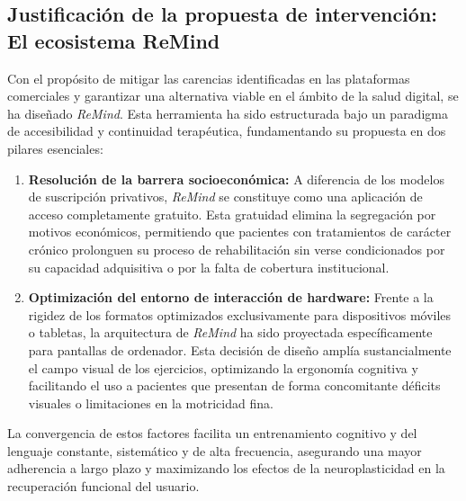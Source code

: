 \subsection{Justificación de la propuesta de intervención: El ecosistema ReMind}
Con el propósito de mitigar las carencias identificadas en las plataformas comerciales y garantizar una alternativa viable en el ámbito de la salud digital, se ha diseñado \textit{ReMind}. Esta herramienta ha sido estructurada bajo un paradigma de accesibilidad y continuidad terapéutica, fundamentando su propuesta en dos pilares esenciales:

\begin{enumerate}
    \item \textbf{Resolución de la barrera socioeconómica:} A diferencia de los modelos de suscripción privativos, \textit{ReMind} se constituye como una aplicación de acceso completamente gratuito. Esta gratuidad elimina la segregación por motivos económicos, permitiendo que pacientes con tratamientos de carácter crónico prolonguen su proceso de rehabilitación sin verse condicionados por su capacidad adquisitiva o por la falta de cobertura institucional.
    
    \item \textbf{Optimización del entorno de interacción de hardware:} Frente a la rigidez de los formatos optimizados exclusivamente para dispositivos móviles o tabletas, la arquitectura de \textit{ReMind} ha sido proyectada específicamente para pantallas de ordenador. Esta decisión de diseño amplía sustancialmente el campo visual de los ejercicios, optimizando la ergonomía cognitiva y facilitando el uso a pacientes que presentan de forma concomitante déficits visuales o limitaciones en la motricidad fina. 
\end{enumerate}

La convergencia de estos factores facilita un entrenamiento cognitivo y del lenguaje constante, sistemático y de alta frecuencia, asegurando una mayor adherencia a largo plazo y maximizando los efectos de la neuroplasticidad en la recuperación funcional del usuario.